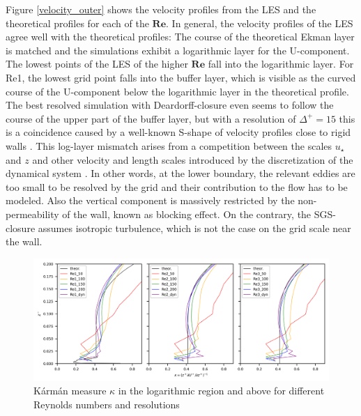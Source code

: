 \documentclass[a4paper,11pt]{article}
\newcommand{\RE}{\mathbf{Re}}
\begin{document}
Figure \ref{velocity_outer} shows the velocity profiles from the LES and the theoretical profiles for each of the $\RE$. In general, the velocity profiles of the LES agree well with the theoretical profiles: The course of the theoretical Ekman layer is matched and the simulations exhibit a logarithmic layer for the U-component. The lowest points of the LES of the higher $\RE$ fall into the logarithmic layer. For Re1, the lowest grid point falls into the buffer layer, which is visible as the curved course of the U-component below the logarithmic layer in the theoretical profile. The best resolved simulation with Deardorff-closure even seems to follow the course of the upper part of the buffer layer, but with a resolution of $\Delta^+=15$ this is a coincidence caused by a well-known S-shape of velocity profiles close to rigid walls \cite{brasseur2010designing}. This log-layer mismatch arises from a competition between the scales $u_\star$ and $z$ and other velocity and length scales introduced by the discretization of the dynamical system \citep{mason1992stochastic,brasseur2010designing}. In other words, at the lower boundary, the relevant eddies are too small to be resolved by the grid and their contribution to the flow has to be modeled. Also the vertical component is massively restricted by the non-permeability of the wall, known as blocking effect. On the contrary, the SGS-closure assumes isotropic turbulence, which is not the case on the grid scale near the wall.

\begin{figure}[ht]
  \centerline{
	\includegraphics[width=\textwidth]{figures_2024/d3y_3Re_kappa}
}
  \caption{K\'arm\'an measure $\kappa$ in the logarithmic region and above for different Reynolds numbers and resolutions}
  \label{3Re_kappa}
\end{figure}
\end{document}
